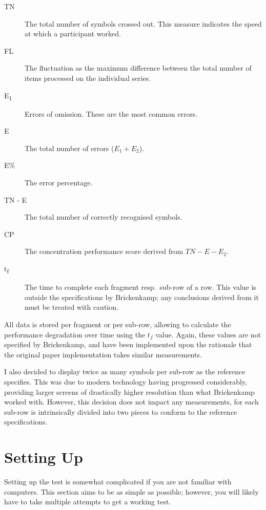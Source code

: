 \documentclass[a4paper,11pt,british,oneside]{article}
\begin{document}
\begin{description}
	\item[TN] The total number of symbols crossed out. This measure indicates the speed at which a participant worked.
	\item[FL] The fluctuation as the maximum difference between the total number of items processed on the individual series.
	\item[E\textsubscript{1}] Errors of omission. These are the most common errors.
	\item[E] The total number of errors ($E_1 + E_2$).
	\item[E\%] The error percentage.
	\item[TN - E] The total number of correctly recognised symbols.
	\item[CP] The concentration performance score derived from $TN-E-E_2$.
	\item[t\textsubscript{f}] The time to complete each fragment resp.\ sub-row of a row. This value is outside the specifications by Brickenkamp; any conclusions derived from it must be treated with caution.
\end{description}
All data is stored per fragment or per sub-row, allowing to calculate the performance degradation over time using the $t_f$ value. Again, these values are not specified by Brickenkamp, and have been implemented upon the rationale that the original paper implementation takes similar measurements.

I also decided to display twice as many symbols per sub-row as the reference specifies. This was due to modern technology having progressed considerably, providing larger screens of drastically higher resolution than what Brickenkamp worked with. However, this decision does not impact any measurements, for each sub-row is intrinsically divided into two pieces to conform to the reference specifications.

\section{Setting Up}
Setting up the test is somewhat complicated if you are not familiar with computers. This section aims to be as simple as possible; however, you will likely have to take multiple attempts to get a working test.
\end{document}
